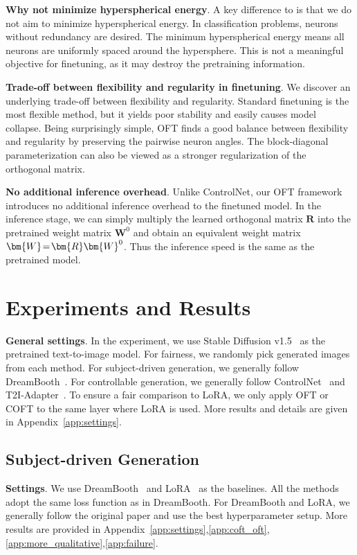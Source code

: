 \textbf{Why not minimize hyperspherical energy}. A key difference to \cite{liu2021orthogonal} is that we do not aim to minimize hyperspherical energy. In classification problems, neurons without redundancy are desired. The minimum hyperspherical energy means all neurons are uniformly spaced around the hypersphere. This is not a meaningful objective for finetuning, as it may destroy the pretraining information.

\textbf{Trade-off between flexibility and regularity in finetuning}. We discover an underlying trade-off between flexibility and regularity. Standard finetuning is the most flexible method, but it yields poor stability and easily causes model collapse. Being surprisingly simple, OFT finds a good balance between flexibility and regularity by preserving the pairwise neuron angles. The block-diagonal parameterization can also be viewed as a stronger regularization of the orthogonal matrix. 

\textbf{No additional inference overhead}. Unlike ControlNet, our OFT framework introduces no additional inference overhead to the finetuned model. In the inference stage, we can simply multiply the learned orthogonal matrix $\bm{R}$ into the pretrained weight matrix $\bm{W}^0$ and obtain an equivalent weight matrix $\thickmuskip=2mu \medmuskip=2mu \bm{W}=\bm{R}\bm{W}^0$. Thus the inference speed is the same as the pretrained model.

\section{Experiments and Results}

\textbf{General settings}. In the experiment, we use Stable Diffusion v1.5~\cite{rombach2022high} as the pretrained text-to-image model. For fairness, we randomly pick generated images from each method. For subject-driven generation, we generally follow DreamBooth~\cite{ruiz2023dreambooth}. For controllable generation, we generally follow  ControlNet~\cite{zhang2023adding} and T2I-Adapter~\cite{mou2023t2i}. To ensure a fair comparison to LoRA, we only apply OFT or COFT to the same layer where LoRA is used. More results and details are given in Appendix~\ref{app:settings}.

\subsection{Subject-driven Generation}

\textbf{Settings}. We use DreamBooth~\cite{ruiz2023dreambooth} and LoRA~\cite{hulora2022} as the baselines. All the methods adopt the same loss function as in DreamBooth. For DreamBooth and LoRA, we generally follow the original paper and use the best hyperparameter setup. More results are provided in Appendix~\ref{app:settings},\ref{app:coft_oft},\ref{app:more_qualitative},\ref{app:failure}.

